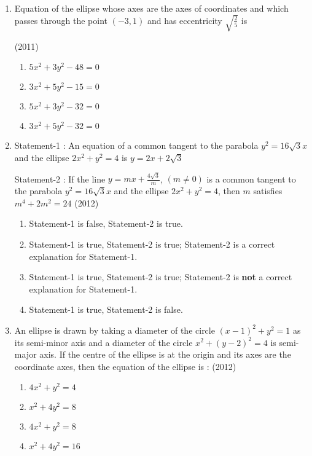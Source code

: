 \documentclass[journal,12pt,twocolumn]{IEEEtran}
\theoremstyle{remark}
\begin{document}
\begin{enumerate}
    \item Equation of the ellipse whose axes are the axes of coordinates and which passes through the point $(-3,1)$ and has eccentricity $\sqrt{\frac{2}{5}}$ is
    
    \hfill(2011)
    
    \begin{enumerate}[label=(\alph*)]
    \item$5x^2+3y^2-48=0$
    \item$3x^2+5y^2-15=0$
    \item$5x^2+3y^2-32=0$ 
    \item$3x^2+5y^2-32=0$ \\
    \end{enumerate}

    \item
    Statement-1 : An equation of a common tangent to the parabola $y^2=16\sqrt{3}x$ and the ellipse $2x^2+y^2=4$ is $y=2x+2\sqrt{3}$
    
    Statement-2 : If the line $y=mx+\frac{4\sqrt{3}}{m}$, $(m\neq0)$ is a common tangent to the parabola $y^2=16\sqrt{3}x$ and the ellipse $2x^2+y^2=4$, then $m$ satisfies $m^4+2m^2=24$ 
    \hfill(2012)
    \begin{enumerate}[label=(\alph*)]
    \item Statement-1 is false, Statement-2 is true.
    \item Statement-1 is true, Statement-2 is true; Statement-2 is a correct explanation for Statement-1.
    \item Statement-1 is true, Statement-2 is true; Statement-2 is \textbf{not} a correct explanation for Statement-1.
    \item Statement-1 is true, Statement-2 is false.\\
    \end{enumerate}
    \item An ellipse is drawn by taking a diameter of the circle $(x-1)^2+y^2=1$ as its semi-minor axis and a diameter of the circle $x^2+(y-2)^2=4$ is semi-major axis. If the centre of the ellipse is at the origin and its axes are the coordinate axes, then the equation of the ellipse is : 
    \hfill(2012)
    
    \begin{enumerate}[label=(\alph*)]
    \item$4x^2+y^2=4$
    \item$x^2+4y^2=8$
    \item$4x^2+y^2=8$
    \item$x^2+4y^2=16$ \\
    \end{enumerate}


\end{enumerate}
\end{document}
